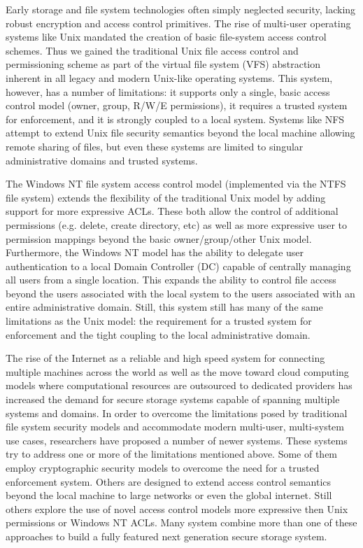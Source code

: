 Early storage and file system technologies often simply neglected
security, lacking robust encryption and access control primitives. The
rise of multi-user operating systems like Unix mandated the creation
of basic file-system access control schemes. Thus we gained the
traditional Unix file access control and permissioning scheme as part
of the virtual file system (VFS) abstraction inherent in all legacy
and modern Unix-like operating systems. This system, however, has a
number of limitations: it supports only a single, basic access control
model (owner, group, R/W/E permissions), it requires a trusted system
for enforcement, and it is strongly coupled to a local system. Systems
like NFS attempt to extend Unix file security semantics beyond the
local machine allowing remote sharing of files, but even these systems
are limited to singular administrative domains and trusted systems.

The Windows NT file system access control model (implemented via the
NTFS file system) extends the flexibility of the traditional Unix
model by adding support for more expressive ACLs. These both allow the
control of additional permissions (e.g. delete, create directory, etc)
as well as more expressive user to permission mappings beyond the
basic owner/group/other Unix model. Furthermore, the Windows NT model
has the ability to delegate user authentication to a local Domain
Controller (DC) capable of centrally managing all users from a single
location. This expands the ability to control file access beyond the
users associated with the local system to the users associated with an
entire administrative domain. Still, this system still has many of the
same limitations as the Unix model: the requirement for a trusted
system for enforcement and the tight coupling to the local
administrative domain.

The rise of the Internet as a reliable and high speed system for
connecting multiple machines across the world as well as the move
toward cloud computing models where computational resources are
outsourced to dedicated providers has increased the demand for secure
storage systems capable of spanning multiple systems and domains. In
order to overcome the limitations posed by traditional file system
security models and accommodate modern multi-user, multi-system use
cases, researchers have proposed a number of newer systems. These
systems try to address one or more of the limitations mentioned
above. Some of them employ cryptographic security models to overcome
the need for a trusted enforcement system. Others are designed to
extend access control semantics beyond the local machine to large
networks or even the global internet. Still others explore the use of
novel access control models more expressive then Unix permissions or
Windows NT ACLs. Many system combine more than one of these approaches
to build a fully featured next generation secure storage system.

